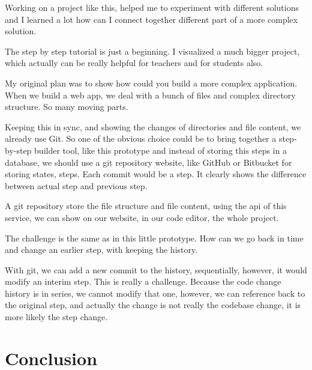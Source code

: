 \documentclass[12pt, a4paper, oneside, openright, medskipamount]{report}
\begin{document}
Working on a project like this, helped me to experiment with different solutions and I learned a lot how can I connect together different part of a more complex solution.

The step by step tutorial is just a beginning. I visualized a much bigger project, which actually can be really helpful for teachers and for students also.

My original plan was to show how could you build a more complex application. When we build a web app, we deal with a bunch of files and complex directory structure. So many moving parts.

Keeping this in sync, and showing the changes of directories and file content, we already use Git. So one of the obvious choice could be to bring together a step-by-step builder tool, like this prototype and instead of storing this steps in a database, we should use a git repository website, like GitHub or Bitbucket for storing states, steps. Each commit would be a step. It clearly shows the difference between actual step and previous step.

A git repository store the file structure and file content, using the api of this service, we can show on our website, in our code editor, the whole project.

The challenge is the same as in this little prototype. How can we go back in time and change an earlier step, with keeping the history.

With git, we can add a new commit to the history, sequentially, however, it would modify an interim step. This is really a challenge. Because the code change history is in series, we cannot modify that one, however, we can reference back to the original step, and actually the change is not really the codebase change, it is more likely the step change.

\chapter{Conclusion}




\backmatter



\end{document}
